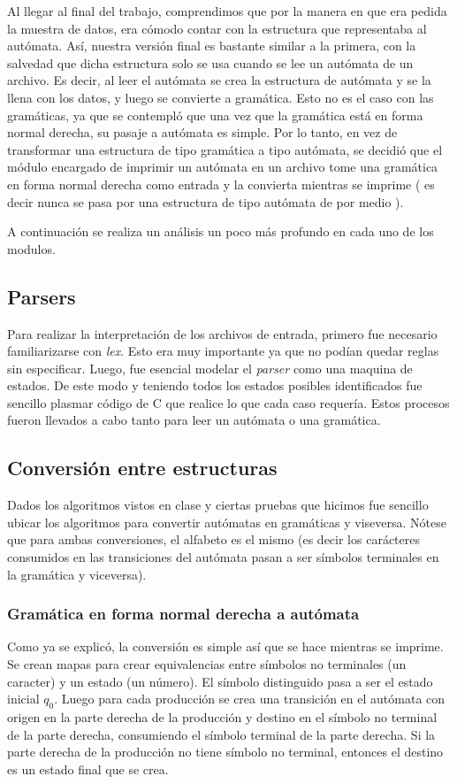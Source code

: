 \documentclass[a4paper,10pt]{article}
\begin{document}
      Al llegar al final del trabajo, comprendimos que por la manera en que era pedida la muestra de datos,
       era cómodo contar con la estructura que representaba al autómata. Así, nuestra versión final es bastante similar
       a la primera, con la salvedad que dicha estructura solo se usa cuando se lee un autómata de un archivo. Es decir, al leer el autómata 
se crea la estructura de autómata y se la llena con los datos, y luego se convierte a gramática. Esto no es el caso con las gramáticas, ya que 
se contempló que una vez que la gramática está en forma normal derecha, su pasaje a autómata es simple. Por lo tanto, en vez de transformar una estructura 
de tipo gramática a tipo autómata, se decidió que el módulo encargado de imprimir un autómata en un archivo tome una gramática en forma normal derecha 
como entrada y la convierta mientras se imprime ( es decir nunca se pasa por una estructura de tipo autómata de por medio ).

      A continuación se realiza un análisis un poco más profundo en cada uno de los modulos.

      \newpage

      \subsection{Parsers}
            Para realizar la interpretación de los archivos de entrada, primero fue necesario familiarizarse con
            \textit{lex}. Esto era muy importante ya que no podían quedar reglas sin especificar. 
            Luego, fue esencial modelar el \textit{parser} como una maquina de estados. De este modo y teniendo
            todos los estados posibles identificados fue sencillo plasmar código de C que realice lo que cada caso
            requería. 
            Estos procesos fueron llevados a cabo tanto para leer un autómata o una gramática.
      \subsection{Conversión entre estructuras}
            Dados los algoritmos vistos en clase y ciertas pruebas que hicimos fue sencillo ubicar los algoritmos
            para convertir autómatas en gramáticas y viseversa. Nótese que para ambas conversiones, el alfabeto es el mismo (es decir los carácteres 
consumidos en las transiciones del autómata pasan a ser símbolos terminales en la gramática y viceversa).
\subsubsection{Gramática en forma normal derecha a autómata}
Como ya se explicó, la conversión es simple así que se hace mientras se imprime. Se crean mapas para crear equivalencias entre 
símbolos no terminales (un caracter) y un estado (un número). El símbolo distinguido pasa a ser el estado inicial $q_{0}$. Luego para cada producción 
se crea una transición en el autómata con origen en la parte derecha de la producción y destino en el símbolo no terminal de la parte derecha, consumiendo 
el símbolo terminal de la parte derecha. Si la parte derecha de la producción no tiene símbolo no terminal, entonces el destino es un estado final que se 
crea. 
\end{document}
